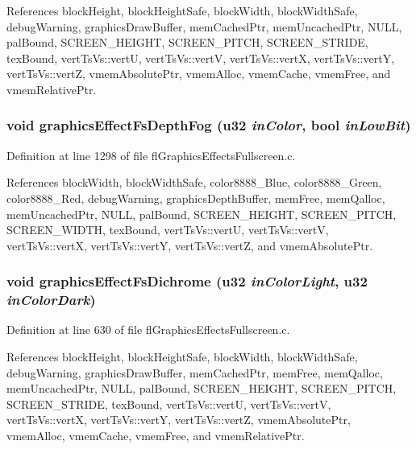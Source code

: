 References block\-Height, block\-Height\-Safe, block\-Width, block\-Width\-Safe, debug\-Warning, graphics\-Draw\-Buffer, mem\-Cached\-Ptr, mem\-Uncached\-Ptr, NULL, pal\-Bound, SCREEN\_\-HEIGHT, SCREEN\_\-PITCH, SCREEN\_\-STRIDE, tex\-Bound, vert\-Ts\-Vs::vert\-U, vert\-Ts\-Vs::vert\-V, vert\-Ts\-Vs::vert\-X, vert\-Ts\-Vs::vert\-Y, vert\-Ts\-Vs::vert\-Z, vmem\-Absolute\-Ptr, vmem\-Alloc, vmem\-Cache, vmem\-Free, and vmem\-Relative\-Ptr.
\subsubsection{\setlength{\rightskip}{0pt plus 5cm}void graphics\-Effect\-Fs\-Depth\-Fog (u32 {\em in\-Color}, {\bf bool} {\em in\-Low\-Bit})}\label{flGraphicsEffectsFullscreen_8c_9a2b81c1973c1834558b38e0c5c9d6a3}




Definition at line 1298 of file fl\-Graphics\-Effects\-Fullscreen.c.

References block\-Width, block\-Width\-Safe, color8888\_\-Blue, color8888\_\-Green, color8888\_\-Red, debug\-Warning, graphics\-Depth\-Buffer, mem\-Free, mem\-Qalloc, mem\-Uncached\-Ptr, NULL, pal\-Bound, SCREEN\_\-HEIGHT, SCREEN\_\-PITCH, SCREEN\_\-WIDTH, tex\-Bound, vert\-Ts\-Vs::vert\-U, vert\-Ts\-Vs::vert\-V, vert\-Ts\-Vs::vert\-X, vert\-Ts\-Vs::vert\-Y, vert\-Ts\-Vs::vert\-Z, and vmem\-Absolute\-Ptr.
\subsubsection{\setlength{\rightskip}{0pt plus 5cm}void graphics\-Effect\-Fs\-Dichrome (u32 {\em in\-Color\-Light}, u32 {\em in\-Color\-Dark})}\label{flGraphicsEffectsFullscreen_8c_e79afa2a4e14dec02855e84ba168afde}




Definition at line 630 of file fl\-Graphics\-Effects\-Fullscreen.c.

References block\-Height, block\-Height\-Safe, block\-Width, block\-Width\-Safe, debug\-Warning, graphics\-Draw\-Buffer, mem\-Cached\-Ptr, mem\-Free, mem\-Qalloc, mem\-Uncached\-Ptr, NULL, pal\-Bound, SCREEN\_\-HEIGHT, SCREEN\_\-PITCH, SCREEN\_\-STRIDE, tex\-Bound, vert\-Ts\-Vs::vert\-U, vert\-Ts\-Vs::vert\-V, vert\-Ts\-Vs::vert\-X, vert\-Ts\-Vs::vert\-Y, vert\-Ts\-Vs::vert\-Z, vmem\-Absolute\-Ptr, vmem\-Alloc, vmem\-Cache, vmem\-Free, and vmem\-Relative\-Ptr.
